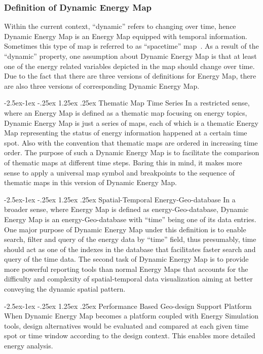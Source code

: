 \documentclass[hidelinks,12pt]{article}
\makeatletter
\renewcommand\paragraph{\@startsection{paragraph}{4}{\z@}%
            {-2.5ex\@plus -1ex \@minus -.25ex}%
            {1.25ex \@plus .25ex}%
            {\normalfont\normalsize\bfseries}}
\makeatother
\begin{document}
\subsubsection{Definition of Dynamic Energy Map}
Within the current context, ``dynamic'' refers to changing over time,
hence Dynamic Energy Map is an Energy Map equipped with temporal
information. Sometimes this type of map is referred to as
``spacetime'' map~\cite{Brownrigg2005}. As a result of the ``dynamic''
property, one assumption about Dynamic Energy Map is that at least one
of the energy related variables depicted in the map should change over
time. Due to the fact that there are three versions of definitions for
Energy Map, there are also three versions of corresponding Dynamic
Energy Map.

\paragraph{Thematic Map Time Series}
In a restricted sense, where an Energy Map is defined as a thematic
map focusing on energy topics, Dynamic Energy Map is just a series of
maps, each of which is a thematic Energy Map representing the status
of energy information happened at a certain time spot. Also with the
convention that thematic maps are ordered in increasing time order.
The purpose of such a Dynamic Energy Map is to facilitate the
comparison of thematic maps at different time steps. Baring this in
mind, it makes more sense to apply a universal map symbol and
breakpoints to the sequence of thematic maps in this version of
Dynamic Energy Map.

\paragraph{Spatial-Temporal Energy-Geo-database}
In a broader sense, where Energy Map is defined as
energy-Geo-database, Dynamic Energy Map is an energy-Geo-database with
``time'' being one of its data entries. One major purpose of Dynamic
Energy Map under this definition is to enable search, filter and query
of the energy data by ``time'' field, thus presumably, time should act
as one of the indexes in the database that facilitates faster search
and query of the time data.  The second task of Dynamic Energy Map is
to provide more powerful reporting tools than normal Energy Maps that
accounts for the difficulty and complexity of spatial-temporal data
visualization aiming at better conveying the dynamic spatial
pattern.

\paragraph{Performance Based Geo-design Support Platform}
When Dynamic Energy Map becomes a platform coupled with Energy
Simulation tools, design alternatives would be evaluated and compared
at each given time spot or time window according to the design
context. This enables more detailed energy analysis.
\end{document}

